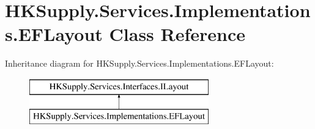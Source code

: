 \hypertarget{class_h_k_supply_1_1_services_1_1_implementations_1_1_e_f_layout}{}\section{H\+K\+Supply.\+Services.\+Implementations.\+E\+F\+Layout Class Reference}
\label{class_h_k_supply_1_1_services_1_1_implementations_1_1_e_f_layout}
Inheritance diagram for H\+K\+Supply.\+Services.\+Implementations.\+E\+F\+Layout\+:\begin{figure}[H]
\begin{center}
\leavevmode
\includegraphics[height=2.000000cm]{class_h_k_supply_1_1_services_1_1_implementations_1_1_e_f_layout}
\end{center}
\end{figure}
